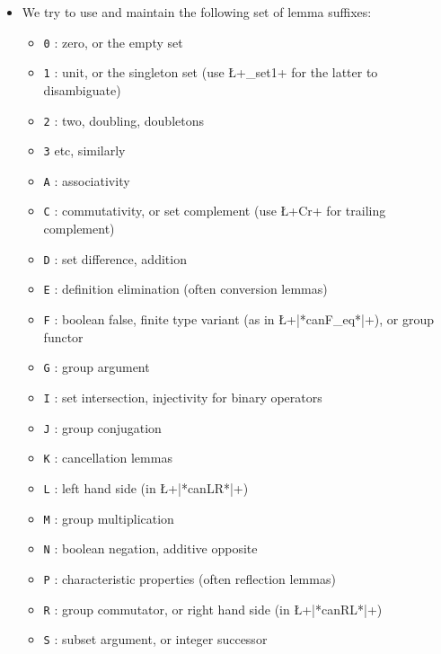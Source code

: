 \begin{itemize}
\begin{itemize}
{      libraries in the Mathematical Component distribution.}:
    the property should be
    indicated by a suffix (like \L+ _char+, \L+_normal+, etc), so
    the lemma name
    should start by a description of the argument of the property, such as
    its key property, or its head constant.
    Thus we have \L+|*quotient_normal*|+, not \L+normal_quotient+, etc. This
    convention does not apply to monotony rules, for which we either
    use the name of the property with the suffix for the operator
    (e.g., \L+|*groupM*|+), or the name of the operator with the S
    suffix for subset monotony (e.g., \L+|*mulgS*|+).
  \item We try to use and maintain the following set of lemma suffixes:
    \begin{itemize}
    \item {\tt 0} : zero, or the empty set
    \item {\tt 1} : unit, or the singleton set (use \L+_set1+ for
      the latter to disambiguate)
    \item {\tt 2} : two, doubling, doubletons
    \item {\tt 3} etc, similarly
    \item {\tt A} : associativity
    \item {\tt C} : commutativity, or set complement (use \L+Cr+
      for trailing complement)
    \item {\tt D} : set difference, addition
    \item {\tt E} : definition elimination (often conversion
      lemmas)
    \item {\tt F} : boolean false, finite type variant (as in
      \L+|*canF_eq*|+), or group functor
    \item {\tt G} : group argument
    \item {\tt I} : set intersection, injectivity for binary operators
    \item {\tt J} : group conjugation
    \item {\tt K} : cancellation lemmas
    \item {\tt L} : left hand side (in \L+|*canLR*|+)
    \item {\tt M} : group multiplication
    \item {\tt N} : boolean negation, additive opposite
    \item {\tt P} : characteristic properties (often reflection
      lemmas)
    \item {\tt R} : group commutator, or right hand side (in
      \L+|*canRL*|+)
    \item {\tt S} : subset argument, or integer successor

\end{itemize}
\end{itemize}
\end{itemize}
